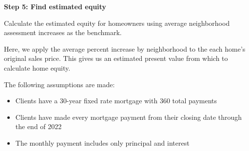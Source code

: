 \documentclass[
  letterpaper,
  DIV=11,
  numbers=noendperiod]{scrartcl}
\providecommand{\tightlist}{%
  \setlength{\itemsep}{0pt}\setlength{\parskip}{0pt}}\usepackage{longtable,booktabs,array}
\begin{document}
\textbf{Step 5: Find estimated equity}

Calculate the estimated equity for homeowners using average neighborhood
assessment increases as the benchmark.

Here, we apply the average percent increase by neighborhood to the each
home's original sales price. This gives us an estimated present value
from which to calculate home equity.

The following assumptions are made:

\begin{itemize}
\tightlist
\item
  Clients have a 30-year fixed rate mortgage with 360 total payments
\item
  Clients have made every mortgage payment from their closing date
  through the end of 2022
\item
  The monthly payment includes only principal and interest
\end{itemize}
\end{document}
